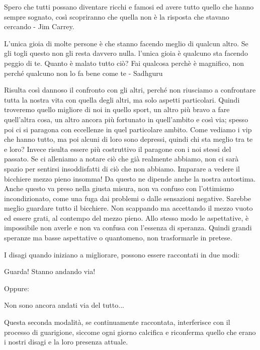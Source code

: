 \documentclass[12pt]{book} %
\begin{document}
Spero che tutti possano diventare ricchi e famosi ed avere tutto quello che hanno sempre sognato, così scopriranno che
quella non è la risposta che stavano cercando - Jim Carrey.

L'unica gioia di molte persone è che stanno facendo meglio di qualcun altro. Se gli togli questo non gli resta davvero nulla. l'unica gioia è qualcuno sta facendo peggio di te. Quanto è malato tutto ciò? Fai qualcosa perchè è magnifico, non perché qualcuno non lo fa bene come te - Sadhguru

Risulta così dannoso il confronto con gli altri, perché non riusciamo a confrontare tutta la nostra vita con quella
degli altri, ma solo aspetti particolari. Quindi troveremo quello migliore di noi in quello sport, un altro più bravo a
fare quell'altra cosa, un altro ancora più fortunato in quell'ambito e così
via; spesso poi ci si paragona con eccellenze in quel particolare ambito. Come vediamo i vip che hanno tutto, ma poi
alcuni di loro sono depressi, quindi chi sta meglio tra te e loro? Invece risulta essere più costruttivo il paragone
con i noi stessi del passato. 
Se ci alleniamo a notare ciò che già realmente abbiamo, non ci sarà spazio per sentirsi
insoddisfatti di ciò che non abbiamo. Imparare a vedere il bicchiere mezzo pieno insomma! Da questo ne dipende anche la
nostra autostima. Anche questo va preso nella giusta misura, non va confuso con l'ottimismo
incondizionato, come una fuga dai problemi o dalle sensazioni negative. Sarebbe meglio guardare tutto il bicchiere. Non
scappando ma accettando il mezzo vuoto ed essere grati, al contempo del mezzo pieno. Allo stesso modo le aspettative, è
impossibile non averle e non va confusa con l'essenza di speranza. Quindi grandi speranze ma basse
aspettative o quantomeno, non trasformarle in pretese.

I disagi quando iniziano a migliorare, possono essere raccontati in due modi:

Guarda! Stanno andando via!

Oppure:

Non sono ancora andati via del tutto...

Questa seconda modalità, se continuamente raccontata, interferisce con il processo di guarigione, siccome ogni giorno
calcifica e riconferma quello che erano i nostri disagi e la loro presenza attuale.
\end{document}
